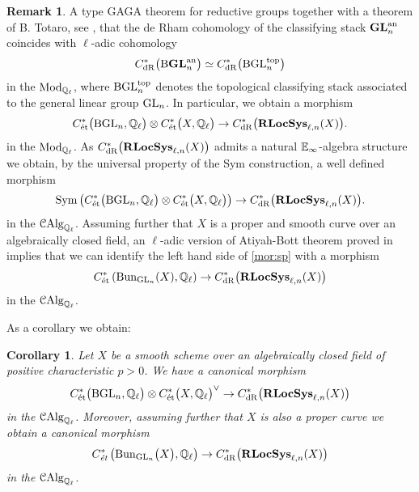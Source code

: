 \documentclass[10pt,a4paper]{amsart}
\numberwithin{equation}{subsection}
\theoremstyle{plain}
\newtheorem{coro}[theorem]{Corollary}
\theoremstyle{definition}
\newtheorem{rema}[theorem]{Remark}
\theoremstyle{remark}
\numberwithin{equation}{section}
\begin{document}
\begin{rema}
A type GAGA theorem for reductive groups together with a theorem of B. Totaro, see \cite[Theorem 10.2]{totaro}, that the de Rham cohomology of the classifying stack $\mathbf{GL}_n^{\mathrm{an}}$ coincides with $\ell$-adic cohomology
	\[
		C^*_{\mathrm{dR}} \big( \mathrm{B} \mathbf{GL}_n^{\mathrm{an}} \big)  \simeq C^*_{\mathrm{dR}} \big( \mathrm{B} \mathrm{GL}_n^{\mathrm{top}} \big)
	\]
in the \infcat $\mathrm{Mod}_{\mathbb Q_\ell}$, where $\mathrm{B} \mathrm{GL}_n^{\mathrm{top}}$ denotes the topological classifying stack associated to the general linear group $\mathrm{GL}_n$. In particular, we obtain a morphism
	\[
		C^*_{\text{\'et}} \big(\mathrm{B} \mathrm{GL}_n, \mathbb Q_\ell \big) \otimes C^*_{\text{\'et}} \big(X, \mathbb Q_\ell \big) \to C^*_{\mathrm{dR}} \big( \mathbf R \mathbf{LocSys}_{\ell, n}(X) \big).
	\]
in the \infcat $\mathrm{Mod}_{\mathbb Q_\ell}$. As $C^*_{\mathrm{dR}} \big( \mathbf R \mathbf{LocSys}_{\ell, n}(X) \big)$ admits a natural $\mathbb E_\infty$-algebra structure we obtain, by the universal property of the Sym construction, a well defined morphism
	\begin{equation} \label{mor:sp}
		\mathrm{Sym} \left( C^*_{\text{\'et}} \big(\mathrm{B} \mathrm{GL}_n, \mathbb Q_\ell \big) \otimes C^*_{\text{\'et}} \big(X, \mathbb Q_\ell \big) \right) \to C^*_{\mathrm{dR}} \big( \mathbf R \mathbf{LocSys}_{\ell, n}(X) \big).
	\end{equation}
in the \infcat $\mathcal{C}\mathrm{Alg}_{\mathbb Q_\ell}$. Assuming further that $X$ is a proper and smooth curve over an algebraically closed field, an $\ell$-adic version of Atiyah-Bott theorem proved in \cite{tamagawa}
implies that we can identify the left hand side of \eqref{mor:sp} with a morphism
	\[
		C^*_{\text{\'et}} \left( \mathrm{Bun}_{\mathrm{GL}_n} (X), \mathbb Q_\ell \right) \to C^*_{\mathrm{dR}} \big( \mathbf R \mathbf{LocSys}_{\ell, n}(X) \big)
	\]
in the \infcat $\mathcal{C}\mathrm{Alg}_{\mathbb Q_\ell}$.
\end{rema}

As a corollary we obtain:

\begin{coro}
Let $X$ be a smooth scheme over an algebraically closed field of positive characteristic $p > 0$. We have a canonical morphism
	\[
		C^*_{\text{\'et}} \big( \mathrm{B} \mathrm{GL}_n, \mathbb Q_\ell \big) \otimes C^*_{\text{\'et}} \big( X, \mathbb Q_\ell \big)^\vee \to C^*_{\mathrm{dR}} \big( \mathbf R \mathbf{LocSys}_{\ell, n}(X) \big)
	\]
in the \infcat $\mathcal{C}\mathrm{Alg}_{\mathbb Q_\ell}$. Moreover, assuming further that $X$ is also a proper curve we obtain a canonical morphism
	\[
		C^*_{\emph{\text{\'et}}} \left( \mathrm{Bun}_{\mathrm{GL}_n} \big(X \big), \mathbb Q_\ell \right) \to  C^*_{\mathrm{dR}} \big( \mathbf R \mathbf{LocSys}_{\ell, n}(X) \big)
	\]
in the \infcat $\mathcal{C}\mathrm{Alg}_{\mathbb Q_\ell}$.
\end{coro}
\end{document}
